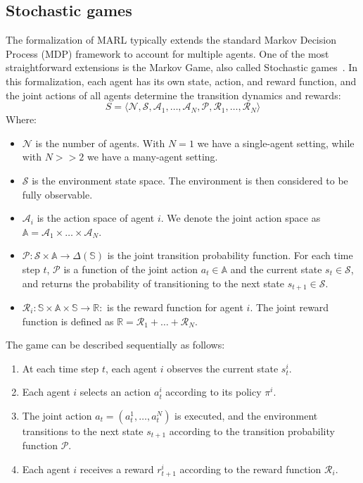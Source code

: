 \subsection{Stochastic games}
The formalization of MARL typically extends the standard Markov Decision Process (MDP) 
 framework to account for multiple agents. 
 One of the most straightforward extensions is the Markov Game, also called Stochastic games~\cite{neyman2003stochastic}. 
 In this formalization, 
each agent has its own state, action, and reward function, 
and the joint actions of all agents determine the transition dynamics and rewards: 
\begin{equation}
S = \langle \mathcal{N}, \mathcal{S}, \mathcal{A}_1, \ldots, \mathcal{A}_N, \mathcal{P}, \mathcal{R}_1, \ldots, \mathcal{R}_N \rangle
\end{equation}
Where:
\begin{itemize}
    \item $\mathcal{N}$ is the number of agents. 
    With $N=1$ we have a single-agent setting, while with $N >> 2$ we have a many-agent setting.
    \item $\mathcal{S}$ is the environment state space. The environment is then considered to be fully observable. 
    \item $\mathcal{A}_i$ is the action space of agent $i$. We denote the joint action space as $\mathbb{A} = \mathcal{A}_1 \times \ldots \times \mathcal{A}_N$.
    \item $\mathcal{P}: \mathcal{S} \times \mathbb{A} \rightarrow \Delta(\mathbb{S})$ is the joint transition probability function. 
    For each time step $t$, $\mathcal{P}$ is a function of the joint action $a_t \in \mathbb{A}$ and the current state $s_t \in \mathcal{S}$, 
    and returns the probability of transitioning to the next state $s_{t+1} \in \mathcal{S}$.
    \item $\mathcal{R}_i: \mathbb{S} \times \mathbb{A} \times \mathbb{S} \rightarrow \mathbb{R}: $ is the reward function for agent $i$. 
    The joint reward function is defined as $\mathbb{R} = \mathcal{R}_1 + \ldots + \mathcal{R}_N$.
\end{itemize}
The game can be described sequentially as follows:
\begin{enumerate}
    \item At each time step $t$, each agent $i$ observes the current state $s_t^i$.
    \item Each agent $i$ selects an action $a_t^i$ according to its policy $\pi^i$.
    \item The joint action $a_t = (a_t^1, \ldots, a_t^N)$ is executed, and the environment transitions to the next state $s_{t+1}$ according to the transition probability function $\mathcal{P}$.
    \item Each agent $i$ receives a reward $r_{t+1}^i$ according to the reward function $\mathcal{R}_i$.
\end{enumerate}
